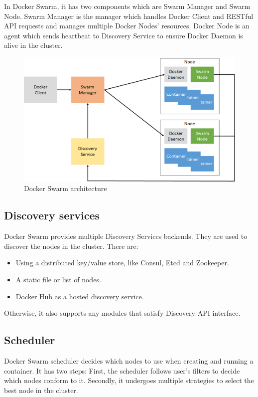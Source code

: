 In Docker Swarm, it has two components which are Swarm Manager and Swarm Node. Swarm Manager is the manager which handles Docker Client and RESTful API requests and manages multiple Docker Nodes' resources. Docker Node is an agent which sends heartbeat to Discovery Service to ensure Docker Daemon is alive in the cluster.

\begin{figure}[h]
\begin{center}
\includegraphics[width=15cm]{figure/swarm_docker.png}
\end{center}
\caption{Docker Swarm architecture}
\end{figure}

\subsection{Discovery services}
Docker Swarm provides multiple Discovery Services backends. They are used to discover the nodes in the cluster. There are:
\begin{itemize}
    \item Using a distributed key/value store, like Consul, Etcd and Zookeeper.
    \item A static file or list of nodes.
    \item Docker Hub as a hosted discovery service.
\end{itemize}
Otherwise, it also supports any modules that satisfy Discovery API interface.

\subsection{Scheduler}
Docker Swarm scheduler decides which nodes to use when creating and running a container. It has two steps:
First, the scheduler follows user's filters to decide which nodes conform to it.
Secondly, it undergoes multiple strategies to select the best node in the cluster.

